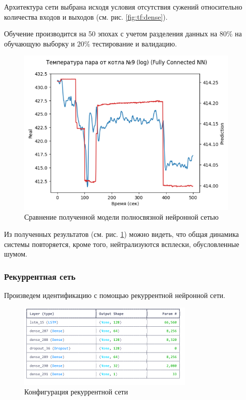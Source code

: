 Архитектура сети выбрана исходя условия отсутствия сужений относительно
количества входов и выходов (см. рис. \ref{fig:tf:dense}). 

Обучение производится на 50 эпохах с учетом разделения данных на $80\%$ на
обучающую выборку и $20\%$ тестирование и валидацию. 

\begin{figure}[H]
  \begin{center}
    \includegraphics[width=0.95\textwidth]{figures/tensorflow/dense_compare.png}
  \end{center}
  \caption{Сравнение полученной модели полносвязной нейронной
  сетью}\label{fig:tf:cmp:dense}
\end{figure}

Из полученных результатов (см. рис. \ref{fig:tf:cmp:dense}) можно видеть, что
общая динамика системы повторяется, кроме того, нейтрализуются всплески,
обусловленные шумом. 

\subsubsection{Рекуррентная сеть}

Произведем идентификацию с помощью рекуррентной нейронной сети. 

\begin{figure}[H]
  \begin{center}
    \includegraphics[width=0.75\textwidth]{figures/tensorflow/rnn.png}
  \end{center}
  \caption{Конфигурация рекуррентной сети}\label{fig:tf:rnn}
\end{figure}

